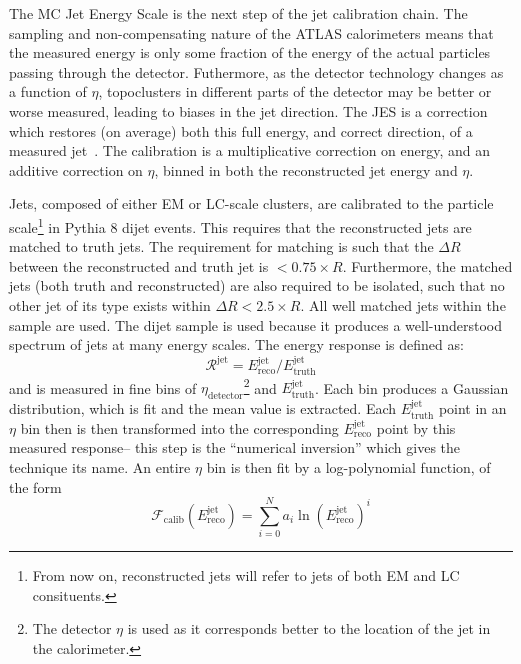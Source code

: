 The MC Jet Energy Scale is the next step of the jet calibration chain. The sampling and non-compensating nature of the ATLAS calorimeters means that the measured energy is only some fraction of the energy of the actual particles passing through the detector. Futhermore, as the detector technology changes as a function of $\eta$, topoclusters in different parts of the detector may be better or worse measured, leading to biases in the jet direction. The JES is a correction which restores (on average) both this full energy, and correct direction, of a measured jet~\cite{JES2010}. The calibration is a multiplicative correction on energy, and an additive correction on $\eta$, binned in both the reconstructed jet energy and $\eta$.

Jets, composed of either EM or LC-scale clusters, are calibrated to the particle scale\footnote{From now on, reconstructed jets will refer to jets of both EM and LC consituents.} in Pythia 8 dijet events. This requires that the reconstructed jets are matched to truth jets. The requirement for matching is such that the $\Delta R$ between the reconstructed and truth jet is $<0.75\times R$. Furthermore, the matched jets (both truth and reconstructed) are also required to be isolated, such that no other jet of its type exists within $\Delta R < 2.5\times R$. All well matched jets within the sample are used. The dijet sample is used because it produces a well-understood spectrum of jets at many energy scales. The energy response is defined as:
%
\begin{equation}
\mathcal{R}^{\mathrm{jet}} = E^{\mathrm{jet}}_{\mathrm{reco}} /  E^{\mathrm{jet}}_{\mathrm{truth}} 
\end{equation}
%
and is measured in fine bins of $\eta_{\mathrm{detector}}$\footnote{The detector $\eta$ is used as it corresponds better to the location of the jet in the calorimeter.} and $E^{\mathrm{jet}}_{\mathrm{truth}}$. Each bin produces a Gaussian distribution, which is fit and the mean value is extracted. Each $E^{\mathrm{jet}}_{\mathrm{truth}}$ point in an $\eta$ bin then is then transformed into the corresponding $E^{\mathrm{jet}}_{\mathrm{reco}}$ point by this measured response-- this step is the ``numerical inversion'' which gives the technique its name. An entire $\eta$ bin is then fit by a log-polynomial function, of the form
%
\begin{equation}
\mathcal{F}_\mathrm{calib}\left(E^{\mathrm{jet}}_{\mathrm{reco}}\right) = \sum_{i=0}^N a_i \ln \left( E^{\mathrm{jet}}_{\mathrm{reco}} \right)^i
\end{equation}
